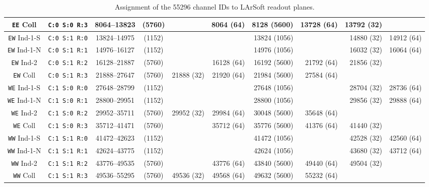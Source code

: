 \begin{table}
\begin{tabular}{|cc|cc|rrrrrr|}
    \texttt{EE} Coll    & \texttt{C:0 S:0 R:3} &  8064--13823 & (5760) &            &  8064 (64) &  8128 (5600) & 13728 (64) & 13792 (32) &            \\
    \hline
    \texttt{EW} Ind-1-S & \texttt{C:0 S:1 R:0} & 13824--14975 & (1152) &            &            & 13824 (1056) &            & 14880 (32) & 14912 (64) \\
    \texttt{EW} Ind-1-N & \texttt{C:0 S:1 R:1} & 14976--16127 & (1152) &            &            & 14976 (1056) &            & 16032 (32) & 16064 (64) \\
    \texttt{EW} Ind-2   & \texttt{C:0 S:1 R:2} & 16128--21887 & (5760) &            & 16128 (64) & 16192 (5600) & 21792 (64) & 21856 (32) &            \\
    \texttt{EW} Coll    & \texttt{C:0 S:1 R:3} & 21888--27647 & (5760) & 21888 (32) & 21920 (64) & 21984 (5600) & 27584 (64) &            &            \\
    \hline
    \hline
    \texttt{WE} Ind-1-S & \texttt{C:1 S:0 R:0} & 27648--28799 & (1152) &            &            & 27648 (1056) &            & 28704 (32) & 28736 (64) \\
    \texttt{WE} Ind-1-N & \texttt{C:1 S:0 R:1} & 28800--29951 & (1152) &            &            & 28800 (1056) &            & 29856 (32) & 29888 (64) \\
    \texttt{WE} Ind-2   & \texttt{C:1 S:0 R:2} & 29952--35711 & (5760) & 29952 (32) & 29984 (64) & 30048 (5600) & 35648 (64) &            &            \\
    \texttt{WE} Coll    & \texttt{C:1 S:0 R:3} & 35712--41471 & (5760) &            & 35712 (64) & 35776 (5600) & 41376 (64) & 41440 (32) &            \\
    \hline
    \texttt{WW} Ind-1-S & \texttt{C:1 S:1 R:0} & 41472--42623 & (1152) &            &            & 41472 (1056) &            & 42528 (32) & 42560 (64) \\
    \texttt{WW} Ind-1-N & \texttt{C:1 S:1 R:1} & 42624--43775 & (1152) &            &            & 42624 (1056) &            & 43680 (32) & 43712 (64) \\
    \texttt{WW} Ind-2   & \texttt{C:1 S:1 R:2} & 43776--49535 & (5760) &            & 43776 (64) & 43840 (5600) & 49440 (64) & 49504 (32) &            \\
    \texttt{WW} Coll    & \texttt{C:1 S:1 R:3} & 49536--55295 & (5760) & 49536 (32) & 49568 (64) & 49632 (5600) & 55232 (64) &            &            \\
    \hline
    \hline
  \end{tabular}
  \caption{
    Assignment of the 55296 channel IDs to LArSoft readout planes.
    \label{table:LArSoftChannels}
  }
\end{table}

